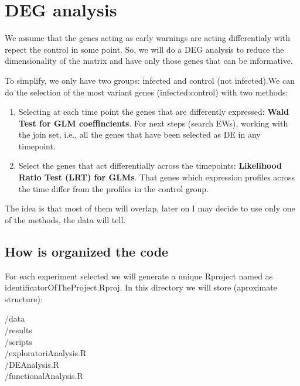 \documentclass[
]{book}
\begin{document}
\hypertarget{deg-analysis}{%
\chapter{DEG analysis}\label{deg-analysis}}

We assume that the genes acting as early warnings are acting differentialy with repect the control in some point. So, we will do a DEG analysis to reduce the dimensionality of the matrix and have only those genes that can be informative.

To simplify, we only have two groups: infected and control (not infected).We can do the selection of the most variant genes (infected:control) with two methods:

\begin{enumerate}
\def\labelenumi{\arabic{enumi})}
\item
  Selecting at each time point the genes that are differently expressed: \textbf{Wald Test for GLM coeffincients}. For next steps (search EWs), working with the join set, i.e., all the genes that have been selected as DE in any timepoint.
\item
  Select the genes that act differentially across the timepoints: \textbf{Likelihood Ratio Test (LRT) for GLMs}. That genes which expression profiles across the time differ from the profiles in the control group.
\end{enumerate}

The idea is that most of them will overlap, later on I may decide to use only one of the methods, the data will tell.

\hypertarget{how-is-organized-the-code}{%
\section{How is organized the code}\label{how-is-organized-the-code}}

For each experiment selected we will generate a unique Rproject named as identificatorOfTheProject.Rproj. In this directory we will store (aproximate structure):

/data\\
/results\\
/scripts\\
\hspace*{0.333em}\hspace*{0.333em}\hspace*{0.333em}\hspace*{0.333em}\hspace*{0.333em}/exploratoriAnalysis.R\\
\hspace*{0.333em}\hspace*{0.333em}\hspace*{0.333em}\hspace*{0.333em}\hspace*{0.333em}/DEAnalysis.R\\
\hspace*{0.333em}\hspace*{0.333em}\hspace*{0.333em}\hspace*{0.333em}\hspace*{0.333em}/functionalAnalysis.R
\end{document}

